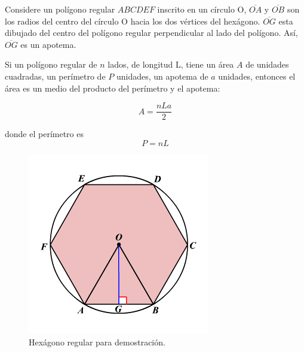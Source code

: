 \begin{tcolorbox}[
        colback=colorrds!5!white,
        colframe=colorrds!35!white,
        coltitle=black,
        fonttitle=\bfseries,
        center title,
        title=Áreas de polígonos regulares]

    \begin{minipage}{.6\textwidth}
        Considere un polígono regular $ABCDEF$ inscrito en un círculo O, $\overline{OA}$ y $\overline{OB}$  son los radios del centro del círculo O hacia los dos vértices del hexágono. $\overline{OG}$ esta dibujado del centro del polígono regular perpendicular al lado del polígono. Así, $\overline{OG}$ es un apotema.

        Si un polígono regular de $n$ lados, de longitud L, tiene un área $A$ de unidades cuadradas, un perímetro de $P$ unidades, un apotema de $a$ unidades, entonces el área es un medio del producto del perímetro y el apotema:

        \[A=\dfrac{nLa}{2}\]

        donde el perímetro es \[P=nL\]
    \end{minipage}\hfill
    \begin{minipage}{.3\textwidth}
        \begin{figure}[H]
            \centering
            \includegraphics[width=0.9\linewidth]{../images/apothem}
            \caption{Hexágono regular para demostración.}
            \label{fig:}
        \end{figure}
    \end{minipage}

\end{tcolorbox}
